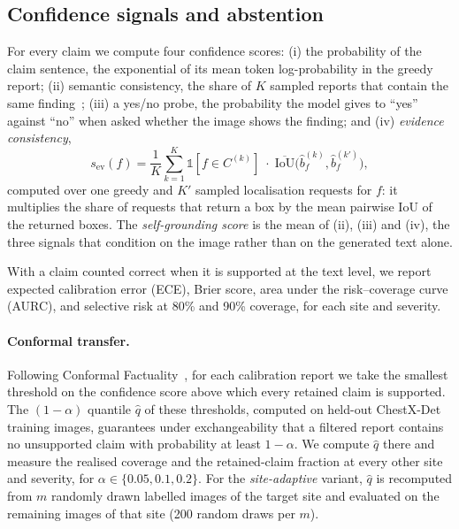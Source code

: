 \documentclass[pdflatex,sn-mathphys-num]{sn-jnl}
\newcommand{\IoU}{\mathrm{IoU}}
\theoremstyle{thmstyleone}
\begin{document}
\subsection{Confidence signals and abstention}\label{sec:reliability}

For every claim we compute four confidence scores: (i) the probability of the claim sentence, the exponential of its mean token log-probability in the greedy report; (ii) semantic consistency, the share of $K$ sampled reports that contain the same finding~\cite{semcons}; (iii) a yes/no probe, the probability the model gives to ``yes'' against ``no'' when asked whether the image shows the finding; and (iv) \emph{evidence consistency},
\begin{equation}
s_{\mathrm{ev}}(f) = \frac{1}{K}\sum_{k=1}^{K}\mathbb{1}[f\in C^{(k)}]\;\cdot\;\overline{\IoU}\big(\hat b^{(k)}_f, \hat b^{(k')}_f\big),
\end{equation}
computed over one greedy and $K'$ sampled localisation requests for $f$: it multiplies the share of requests that return a box by the mean pairwise IoU of the returned boxes. The \emph{self-grounding score} is the mean of (ii), (iii) and (iv), the three signals that condition on the image rather than on the generated text alone.

With a claim counted correct when it is supported at the text level, we report expected calibration error (ECE), Brier score, area under the risk--coverage curve (AURC), and selective risk at 80\% and 90\% coverage, for each site and severity.

\paragraph{Conformal transfer.} Following Conformal Factuality~\cite{conffact}, for each calibration report we take the smallest threshold on the confidence score above which every retained claim is supported. The $(1-\alpha)$ quantile $\hat q$ of these thresholds, computed on held-out ChestX-Det training images, guarantees under exchangeability that a filtered report contains no unsupported claim with probability at least $1-\alpha$. We compute $\hat q$ there and measure the realised coverage and the retained-claim fraction at every other site and severity, for $\alpha\in\{0.05, 0.1, 0.2\}$. For the \emph{site-adaptive} variant, $\hat q$ is recomputed from $m$ randomly drawn labelled images of the target site and evaluated on the remaining images of that site (200 random draws per $m$).
\end{document}
